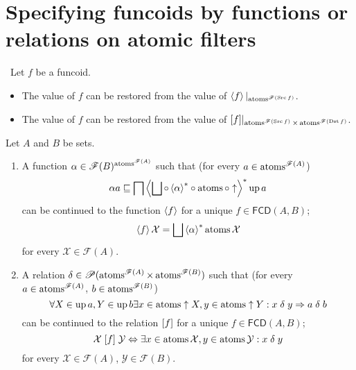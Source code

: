 \section{Specifying funcoids by functions or relations on atomic filters}
\begin{cor}
~Let $f$ be a funcoid.
\begin{itemize}
\item The value of $f$ can be restored from the value of $\left\langle f\right\rangle|_{\operatorname{atoms}^{\mathscr{F}(\operatorname{Src} f)}}$.
\item The value of $f$ can be restored from the value of $\mathord{\mathrel{\left[f\right]}}|_{\operatorname{atoms}^{\mathscr{F}(\operatorname{Src} f)}\times\operatorname{atoms}^{\mathscr{F}(\operatorname{Dst} f)}}$.
\end{itemize}
\end{cor}
\begin{thm}
\label{cont-fcd-on-atoms}Let $A$ and $B$ be sets.
\begin{enumerate}
\item \label{at-restr-f}A function
$\alpha\in\mathscr{F}(B)^{\operatorname{atoms}^{\mathscr{F}(A)}}$
such that (for every $a\in\operatorname{atoms}^{\mathscr{F}(A)}$)
\begin{equation}
\alpha
a\sqsubseteq\bigsqcap\rsupfun{\bigsqcup\circ\rsupfun{\alpha}
\circ\atoms\circ\uparrow}\up a\label{at-func-cond}
\end{equation}
can be continued to the function $\left\langle f\right\rangle$ for a unique
$f\in\mathsf{FCD}(A,B)$;
\begin{equation}
\supfun
f\mathcal{X}=\bigsqcup\rsupfun{\alpha}\atoms\mathcal{X}\label{at-func-eq}
\end{equation}
for every $\mathcal{X}\in\mathscr{F}(A)$.

\item \label{at-restr-r}A relation
$\delta\in\mathscr{P}(\operatorname{atoms}^{\mathscr{F}(A)}\times\operatorname{atoms}^{\mathscr{F}(B)})$
such that (for every $a\in\operatorname{atoms}^{\mathscr{F}(A)}$,
$b\in\operatorname{atoms}^{\mathscr{F}(B)}$)
\begin{equation}
\forall X\in\operatorname{up} a,Y\in\operatorname{up} b\exists x\in\operatorname{atoms}\uparrow X,y\in\operatorname{atoms}\uparrow
Y:x\mathrel\delta y\Rightarrow a\mathrel\delta b\label{at-rel-cond}
\end{equation}
can be continued to the relation $\mathrel{\left[f\right]}$ for a unique
$f\in\mathsf{FCD}(A,B)$;
\begin{equation}
\mathcal{X}\mathrel{\left[f\right]}\mathcal{Y}\Leftrightarrow\exists
x\in\operatorname{atoms}\mathcal{X},y\in\operatorname{atoms}\mathcal{Y}:x\mathrel\delta y\label{at-rel-eq}
\end{equation}
for every $\mathcal{X}\in\mathscr{F}(A)$, $\mathcal{Y}\in\mathscr{F}(B)$.

\end{enumerate}
\end{thm}
